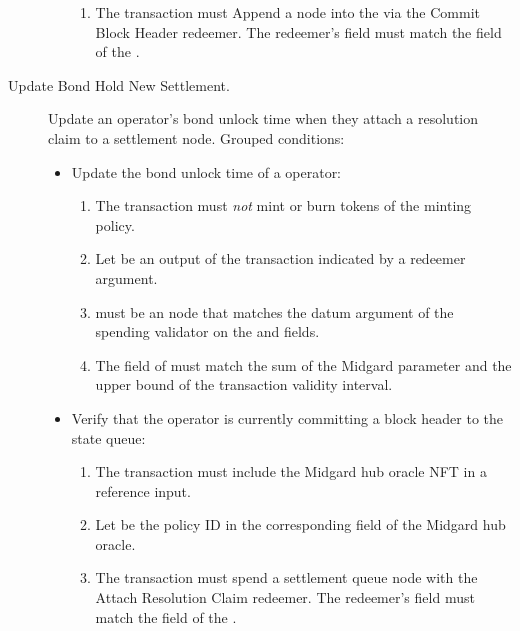\documentclass[../midgard.tex]{subfiles}
\begin{document}
\begin{description}
\begin{itemize}
\begin{enumerate}[resume]
                \item The transaction must Append a node into the  via the Commit Block Header redeemer.
                  The redeemer's  field must match the  field of the .
            \end{enumerate}
        \end{itemize}
    \item[Update Bond Hold New Settlement.] Update an operator's bond unlock time when they attach a resolution claim to a settlement node.
      Grouped conditions:
        \begin{itemize}
            \item Update the bond unlock time of a operator:
            \begin{enumerate} 
                \item The transaction must \emph{not} mint or burn tokens of the  minting policy.
                \item Let  be an output of the transaction indicated by a redeemer argument.
                \item {} must be an  node that matches the datum argument of the spending validator on the  and  fields.
                \item The  field of  must match the sum of the Midgard  parameter and the upper bound of the transaction validity interval.
            \end{enumerate}
            \item Verify that the operator is currently committing a block header to the state queue:
            \begin{enumerate}[resume]
                \item The transaction must include the Midgard hub oracle NFT in a reference input.
                \item Let  be the policy ID in the corresponding field of the Midgard hub oracle.
                \item The transaction must spend a settlement queue node with the Attach Resolution Claim redeemer.
                  The redeemer's  field must match the  field of the .
            \end{enumerate}
        \end{itemize}
\end{description}
\end{document}
